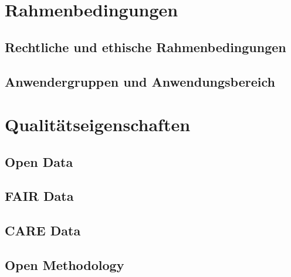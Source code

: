 \onehalfspacing

\section{Rahmenbedingungen}
\subsection{Rechtliche und ethische Rahmenbedingungen}
\subsection{Anwendergruppen und Anwendungsbereich}

\section{Qualitätseigenschaften}
\subsection{Open Data}
\subsection{FAIR Data}
\subsection{CARE Data}
\subsection{Open Methodology}